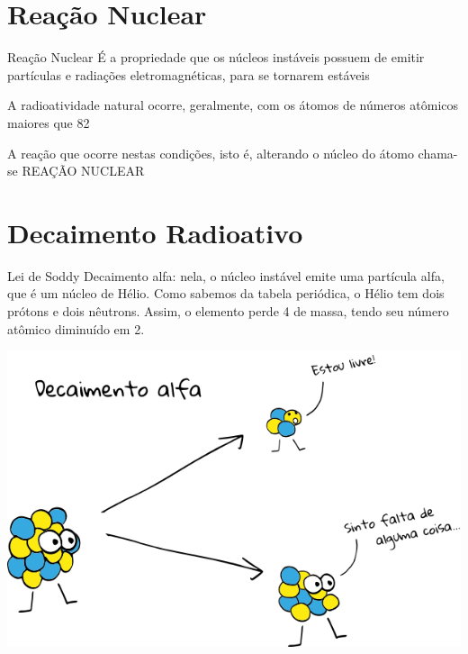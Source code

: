 \documentclass[presentation,professionalfonts,aspectratio=169]{beamer}
\begin{document}
\section{Reação Nuclear}
\label{sec:org0b6f2bc}

\begin{frame}[label={sec:orgbd2d1e4}]{Reação Nuclear}
É a propriedade que os núcleos instáveis possuem de emitir partículas e radiações eletromagnéticas, para se tornarem estáveis


A radioatividade natural ocorre, geralmente, com os átomos de números atômicos maiores que 82


A reação que ocorre nestas condições, isto é, alterando o núcleo do átomo chama-se \alert{REAÇÃO NUCLEAR}
\end{frame}


\section{Decaimento Radioativo}
\label{sec:org635dc3b}


\begin{frame}[label={sec:org41a43de}]{Lei de Soddy}
\alert{Decaimento alfa:} nela, o núcleo instável emite uma partícula alfa, que é um núcleo de Hélio. Como sabemos da tabela periódica, o Hélio tem dois prótons e dois nêutrons. Assim, o elemento perde 4 de massa, tendo seu número atômico diminuído em 2.

\begin{center}
\end{center}

\begin{center}
\includegraphics[scale=0.2]{FQ/Radioatividade/alfa.png}
\end{center}
\end{frame}
\end{document}
